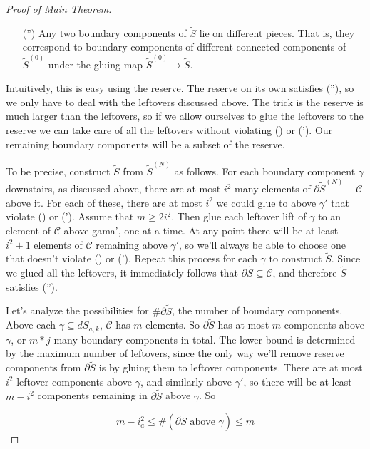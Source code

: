 \documentclass[12pt]{amsart}
\theoremstyle{definition}
\theoremstyle{remark}
\newcommand{\bd}{\partial}
\newcommand{\cin}{\subseteq}
\newcommand{\cC}{\mathcal{C}}
\begin{document}
\begin{proof}[Proof of Main Theorem]
\begin{enumerate}

\item[(\dag'')] Any two boundary components of $\widetilde{S}$ lie on different
pieces. That is, they correspond to boundary components of different connected
components of $\widetilde{S}^{(0)}$ under the gluing map $\widetilde{S}^{(0)}
\to \widetilde{S}$.

\end{enumerate}

Intuitively, this is easy using the reserve. The reserve on its own satisfies
(\dag''), so we only have to deal with the leftovers discussed above.  The trick
is the reserve is much larger than the leftovers, so if we allow ourselves to
glue the leftovers to the reserve we can take care of all the leftovers without
violating (\dag) or (\dag'). Our remaining boundary components will be a subset
of the reserve.

To be precise, construct $\widetilde{S}$ from $\widetilde{S}^{(N)}$ as follows.
For each boundary component $\gamma$ downstairs, as discussed above, there are
at most $i^2$ many elements of $\bd\widetilde{S}^{(N)}-\cC$ above it. For each of
these, there are at most $i^2$ we could glue to above $\gamma'$ that violate
(\dag) or (\dag').  Assume that $m\geq 2i^2$.  Then glue each leftover lift of
$\gamma$ to an element of $\cC$ above gama', one at a time. At any point there
will be at least $i^2+1$ elements of $\cC$ remaining above $\gamma'$, so we'll
always be able to choose one that doesn't violate (\dag) or (\dag'). Repeat
this process for each $\gamma$ to construct $\widetilde{S}$.  Since we glued
all the leftovers, it immediately follows that $\bd\widetilde{S} \cin \cC$, and
therefore $\widetilde{S}$ satisfies (\dag'').

Let's analyze the possibilities for $\#\bd\widetilde{S}$, the number of
boundary components. Above each $\gamma \cin dS_{a,k}$,
$\cC$ has $m$ elements. So $\bd\widetilde{S}$ has at most $m$ components above
$\gamma$, or $m*j$ many boundary components in total. The lower bound is
determined by the maximum number of leftovers, since the only way we'll remove
reserve components from $\bd\widetilde{S}$ is by gluing them to leftover
components. There are at most $i^2$ leftover components above $\gamma$, and
similarly above $\gamma'$, so there will be at least $m - i^2$ components
remaining in $\bd\widetilde{S}$ above $\gamma$. So

\[ m-i_a^2 \leq \#(\bd\widetilde{S} \text{ above }\gamma) \leq m \]


\end{proof}
\end{document}
